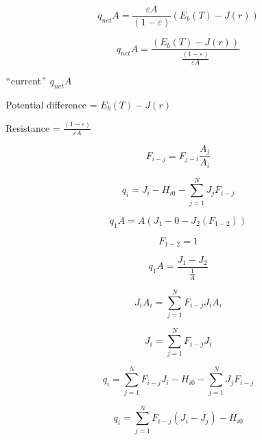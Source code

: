 \documentclass[12pt]{article}
\renewcommand{\_}{\kern-1.5pt\textunderscore\kern-1.5pt}
\begin{document}
 \[ q_{net}A=\frac{ \varepsilon A}{ \left( 1- \varepsilon  \right) } \left( E_{b} \left( T \right) -J \left( r \right)  \right)  \] \par

 \[ q_{net}A=\frac{ \left( E_{b} \left( T \right) -J \left( r \right)  \right) }{\frac{ \left( 1- \varepsilon  \right) }{ \varepsilon A}} \] \par

$``$current$"$   \( q_{net}A \) \par

Potential difference =  \( E_{b} \left( T \right) -J \left( r \right)  \) \par

Resistance =  \( \frac{ \left( 1- \varepsilon  \right) }{ \varepsilon A} \) \par


\vspace{\baselineskip}
\par


\vspace{\baselineskip}
\par

 \[ F_{i-j}=F_{j-i}\frac{A_{j}}{A_{i}} \] \par

 \[ q_{i}=J_{i}-H_{i0}- \sum _{j=1}^{N}J_{j}F_{i-j} \] \par

\par

 \[ q_{1}A=A \left( J_{1}-0-J_{2} \left( F_{1-2} \right)  \right)  \] \par

 \[ F_{1-2}=1 \] \par

 \[ q_{1}A=\frac{J_{1}-J_{2}}{\frac{1}{A}} \] \par

\par

\par

 \[ J_{i}A_{i}= \sum _{j=1}^{N}F_{i-j}J_{i}A_{i} \] \par

 \[ J_{i}= \sum _{j=1}^{N}F_{i-j}J_{i} \] \par

 \[ q_{i}= \sum _{j=1}^{N}F_{i-j}J_{i}-H_{i0}- \sum _{j=1}^{N}J_{j}F_{i-j} \] \par

 \[ q_{i}= \sum _{j=1}^{N}F_{i-j} \left( J_{i}-J_{j} \right) -H_{i0} \] \par
\end{document}

